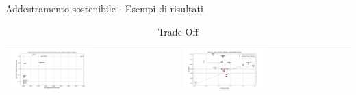 \begin{frame}{Addestramento sostenibile - Esempi di risultati}
    \begin{table}[H]
        \centering
        \footnotesize
        \setlength\tabcolsep{0pt}
        \begin{tabularx}{\textwidth}{|X|X|}
            \hline
            \includegraphics[width=0.5\textwidth, height=0.6\textheight, trim=0 0 0 0]{images/decrement_recall@10_LFM-1b_artist_20U50I_25strat.png} &
            \includegraphics[width=0.5\textwidth, height=0.6\textheight, trim=0 0 0 0]{images/recall@10_LFM-1b_artist_20U50I_25strat_comparison.png} \\
            \hline
        \end{tabularx}
        \caption{Trade-Off}
    \end{table}
\end{frame}


